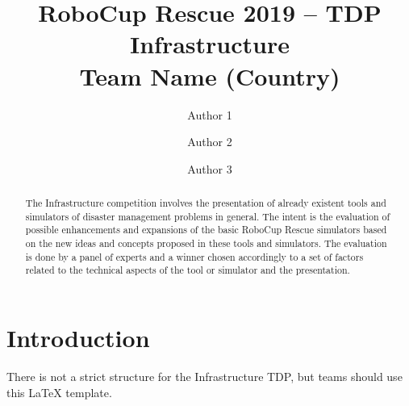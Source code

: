\documentclass[runningheads,a4paper]{llncs}
\begin{document}
\title{RoboCup Rescue 2019 -- TDP Infrastructure\\
       Team Name (Country)}
\author{Author 1 \and Author 2 \and Author 3}
\maketitle
\begin{abstract}
The Infrastructure competition involves the presentation of already existent tools and simulators of disaster management problems in general. The intent is the evaluation of possible enhancements and expansions of the basic RoboCup Rescue simulators based on the new ideas and concepts proposed in these tools and simulators. The evaluation is done by a panel of experts and a winner chosen accordingly to a set of factors related to the technical aspects of the tool or simulator and the presentation.
\end{abstract}
\section{Introduction}
There is not a strict structure for the Infrastructure TDP, but teams should use this LaTeX template.


\end{document}
